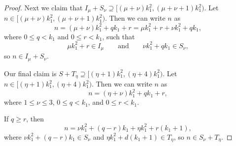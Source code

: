 \documentclass[11pt]{article}
\theoremstyle{definition}
\begin{document}
\begin{proof}
Next we claim that  $I_{\mu}+S_{\nu}\supseteq[(\mu + \nu )k_1^2 ,  (\mu + \nu  + 1)k_1^2)$. Let $n \in[(\mu + \nu )k_1^2 ,  (\mu + \nu  + 1)k_1^2)$.
Then we can write $n$ as 
\[
n = (\mu + \nu ) k_1^2 + qk_1 + r = \mu k_1^2 + r+\nu k_1^2 + qk_1,
\]
where  $0 \leq q < k_1$ and $0 \leq r < k_1$, such that 
\[
\mu k_1^2 + r \in I_\mu \qquad\text{and}\qquad\nu k_1^2 + qk_1 \in S_\nu,
\]
 so $n \in I_{\mu}+S_{\nu}$. 

Our final claim is $S+T_\eta \supseteq[(\eta  +1)k_1^2 ,  (\eta  + 4)k_1^2)$.  Let $n \in[(\eta  +1)k_1^2 ,  (\eta  + 4)k_1^2)$.
Then we can write $n$ as 
\[
n = (\eta  + \nu ) k_1^2 + qk_1 + r, 
\]
where $1 \leq \nu  \leq 3$, $0 \leq q < k_1$, and $0 \leq r < k_1$. 

If $q \geq r$, then
\[
n = \nu k_1^2 + (q - r) k_1+\eta k_1^2 + r(k_1 + 1), 
\]
where $\nu k_1^2 + (q - r)k_1 \in S_\nu$ and $\eta k_1^2 + d(k_1 + 1) \in T_\eta$, so $n \in S_\nu +T_\eta$. 


\end{proof}
\end{document}
